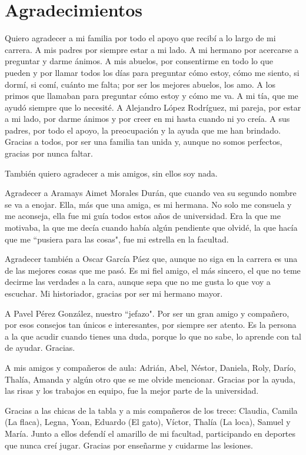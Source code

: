 \chapter*{Agradecimientos}
Quiero agradecer a mi familia por todo el apoyo que recibí a lo largo de mi carrera. A mis padres por siempre estar a mi lado. A mi hermano por acercarse a preguntar y darme ánimos. A mis abuelos, por consentirme en todo lo que pueden y por llamar todos los días para preguntar cómo estoy, cómo me siento, si dormí, si comí, cuánto me falta; por ser los mejores abuelos, los amo. A los primos que llamaban para preguntar cómo estoy y cómo me va. A mi tía, que me ayudó siempre que lo necesité. A Alejandro López Rodríguez, mi pareja, por estar a mi lado, por darme ánimos y por creer en mi hasta cuando ni yo creía. A sus padres, por todo el apoyo, la preocupación y la ayuda que me han brindado. Gracias a todos, por ser una familia tan unida y, aunque no somos perfectos, gracias por nunca faltar.

También quiero agradecer a mis amigos, sin ellos soy nada.

Agradecer a Aramays Aimet Morales Durán, que cuando vea su segundo nombre se va a enojar. Ella, más que una amiga, es mi hermana. No solo me consuela y me aconseja, ella fue mi guía todos estos años de universidad. Era la que me motivaba, la que me decía cuando había algún pendiente que olvidé, la que hacía que me ``pusiera para las cosas", fue mi estrella en la facultad.

Agradecer también a Oscar García Páez que, aunque no siga en la carrera es una de las mejores cosas que me pasó. Es mi fiel amigo, el más sincero, el que no teme decirme las verdades a la cara, aunque sepa que no me gusta lo que voy a escuchar. Mi historiador, gracias por ser mi hermano mayor.

A Pavel Pérez González, nuestro ``jefazo". Por ser un gran amigo y compañero, por esos consejos tan únicos e interesantes, por siempre ser atento. Es la persona a la que acudir cuando tienes una duda, porque lo que no sabe, lo aprende con tal de ayudar. Gracias.

A mis amigos y compañeros de aula: Adrián, Abel, Néstor, Daniela, Roly, Darío, Thalía, Amanda y algún otro que se me olvide mencionar. Gracias por la ayuda, las risas y los trabajos en equipo, fue la mejor parte de la universidad.

Gracias a las chicas de la tabla y a mis compañeros de los trece: Claudia, Camila (La flaca), Legna, Yoan, Eduardo (El gato), Víctor, Thalía (La loca), Samuel y María. Junto a ellos defendí el amarillo de mi facultad, participando en deportes que nunca creí jugar. Gracias por enseñarme y cuidarme las lesiones.

